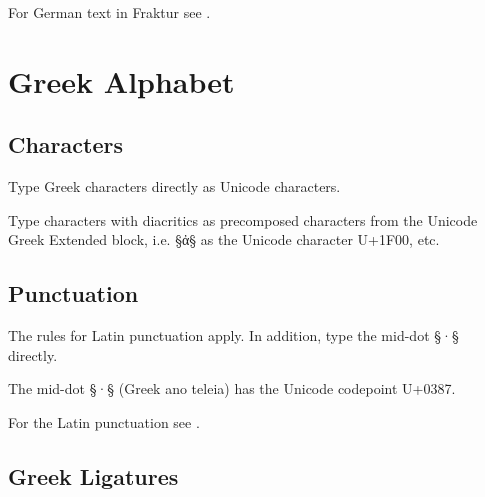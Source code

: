 
\begin{crossref}
For German text in Fraktur see .
\end{crossref}


\section{Greek Alphabet}

\tocspace
\subsection{Characters}

\begin{mainrule}
Type Greek characters directly as Unicode characters.
\end{mainrule}

\begin{clarification}
Type characters with diacritics as precomposed characters from the Unicode Greek Extended block, i.e. §ἀ§ as the Unicode character U+1F00, etc.
\end{clarification}


\tocspace
\subsection{Punctuation}
\label{section greek punctuation}

\begin{mainrule}
The rules for Latin punctuation apply. In addition, type the mid-dot §·§ directly.
\end{mainrule}

\begin{clarification}
The mid-dot §·§ (Greek ano teleia) has the Unicode codepoint U+0387.
\end{clarification}

\begin{crossref}
For the Latin punctuation see .
\end{crossref}


\tocspace
\subsection{Greek Ligatures}
\label{section greek ligatures}


